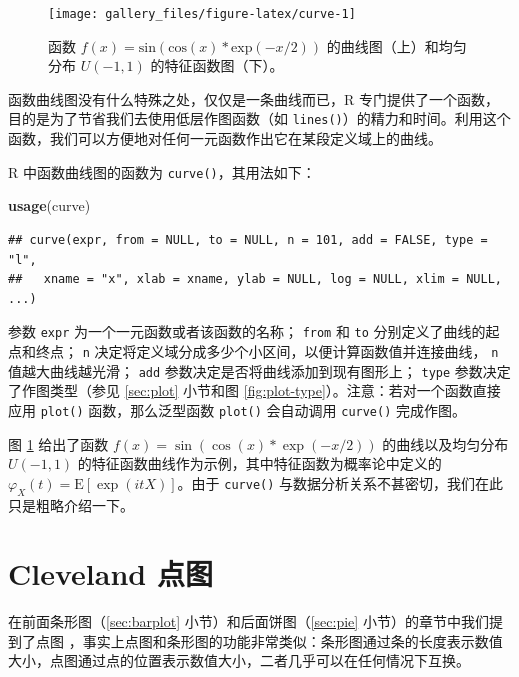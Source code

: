 \documentclass[
  b5paper,
  UTF8,twoside]{book}
\newenvironment{Shaded}{\begin{snugshade}}{\end{snugshade}}
\newcommand{\FunctionTok}[1]{\textcolor[rgb]{0.13,0.29,0.53}{\textbf{#1}}}
\newcommand{\NormalTok}[1]{#1}
\begin{document}
\begin{figure}

{\centering \texttt{[image: gallery\_files/figure-latex/curve-1]} 

}

\caption[函数 \(f(x)=\mathrm{sin}(\mathrm{cos}(x)*\mathrm{exp}(-x/2))\) 的曲线图]{函数 \(f(x)=\mathrm{sin}(\mathrm{cos}(x)*\mathrm{exp}(-x/2))\) 的曲线图（上）和均匀分布 \(U(-1,1)\) 的特征函数图（下）。}\label{fig:curve}
\end{figure}

函数曲线图没有什么特殊之处，仅仅是一条曲线而已，R 专门提供了一个函数，目的是为了节省我们去使用低层作图函数（如 \texttt{lines()}）的精力和时间。利用这个函数，我们可以方便地对任何一元函数作出它在某段定义域上的曲线。

R 中函数曲线图的函数为 \texttt{curve()}，其用法如下：

\begin{Shaded}
\begin{Highlighting}[]
\FunctionTok{usage}\NormalTok{(curve)}
\end{Highlighting}
\end{Shaded}

\begin{verbatim}
## curve(expr, from = NULL, to = NULL, n = 101, add = FALSE, type = "l",
##   xname = "x", xlab = xname, ylab = NULL, log = NULL, xlim = NULL, ...)
\end{verbatim}

参数 \texttt{expr} 为一个一元函数或者该函数的名称； \texttt{from} 和 \texttt{to} 分别定义了曲线的起点和终点； \texttt{n} 决定将定义域分成多少个小区间，以便计算函数值并连接曲线， \texttt{n} 值越大曲线越光滑； \texttt{add} 参数决定是否将曲线添加到现有图形上； \texttt{type} 参数决定了作图类型（参见 \ref{sec:plot} 小节和图 \ref{fig:plot-type}）。注意：若对一个函数直接应用 \texttt{plot()} 函数，那么泛型函数 \texttt{plot()} 会自动调用 \texttt{curve()} 完成作图。

图 \ref{fig:curve} 给出了函数 \(f(x)=\sin(\cos(x)*\exp(-x/2))\) 的曲线以及均匀分布 \(U(-1,1)\) 的特征函数曲线作为示例，其中特征函数为概率论中定义的 \(\varphi_{X}(t) = \mathrm{E}[\exp(itX)]\)。由于 \texttt{curve()} 与数据分析关系不甚密切，我们在此只是粗略介绍一下。

\section{Cleveland 点图}\label{sec:dotchart}

在前面条形图（\ref{sec:barplot} 小节）和后面饼图（\ref{sec:pie} 小节）的章节中我们提到了点图 \citep{Cleveland85}，事实上点图和条形图的功能非常类似：条形图通过条的长度表示数值大小，点图通过点的位置表示数值大小，二者几乎可以在任何情况下互换。
\end{document}
